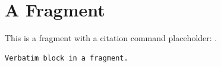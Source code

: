 
\section{A Fragment}
\label{sec:frag}

This is a fragment with a citation command placeholder: \cite{Key2024}.

\begin{verbatim}
Verbatim block in a fragment.
\end{verbatim}
